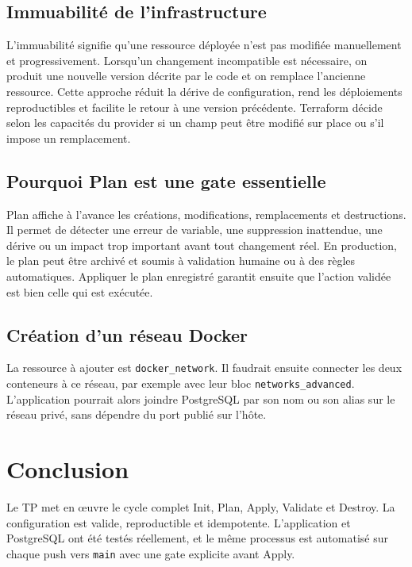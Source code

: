 \documentclass[11pt,a4paper]{article}
\begin{document}
\subsection{Immuabilité de l'infrastructure}

L'immuabilité signifie qu'une ressource déployée n'est pas modifiée manuellement et
progressivement. Lorsqu'un changement incompatible est nécessaire, on produit une
nouvelle version décrite par le code et on remplace l'ancienne ressource. Cette approche
réduit la dérive de configuration, rend les déploiements reproductibles et facilite le
retour à une version précédente. Terraform décide selon les capacités du provider si un
champ peut être modifié sur place ou s'il impose un remplacement.

\subsection{Pourquoi Plan est une gate essentielle}

Plan affiche à l'avance les créations, modifications, remplacements et destructions. Il
permet de détecter une erreur de variable, une suppression inattendue, une dérive ou un
impact trop important avant tout changement réel. En production, le plan peut être
archivé et soumis à validation humaine ou à des règles automatiques. Appliquer le plan
enregistré garantit ensuite que l'action validée est bien celle qui est exécutée.

\subsection{Création d'un réseau Docker}

La ressource à ajouter est \texttt{docker\_network}. Il faudrait ensuite connecter les
deux conteneurs à ce réseau, par exemple avec leur bloc \texttt{networks\_advanced}.
L'application pourrait alors joindre PostgreSQL par son nom ou son alias sur le réseau
privé, sans dépendre du port publié sur l'hôte.

\section{Conclusion}

Le TP met en œuvre le cycle complet Init, Plan, Apply, Validate et Destroy. La
configuration est valide, reproductible et idempotente. L'application et PostgreSQL ont
été testés réellement, et le même processus est automatisé sur chaque push vers
\texttt{main} avec une gate explicite avant Apply.
\end{document}
